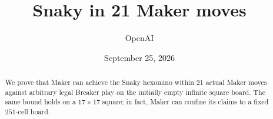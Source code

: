 \documentclass[11pt]{article}
\title{Snaky in 21 Maker moves}
\author{OpenAI}
\date{September 25, 2026}
\theoremstyle{definition}
\theoremstyle{remark}
\begin{document}
\maketitle
\begin{abstract}
We prove that Maker can achieve the Snaky hexomino within 21 actual
Maker moves against arbitrary legal Breaker play on the initially empty
infinite square board. The same bound holds on a $17\times17$ square;
in fact, Maker can confine its claims to a fixed $251$-cell board.
\end{abstract}








\appendix




\end{document}
